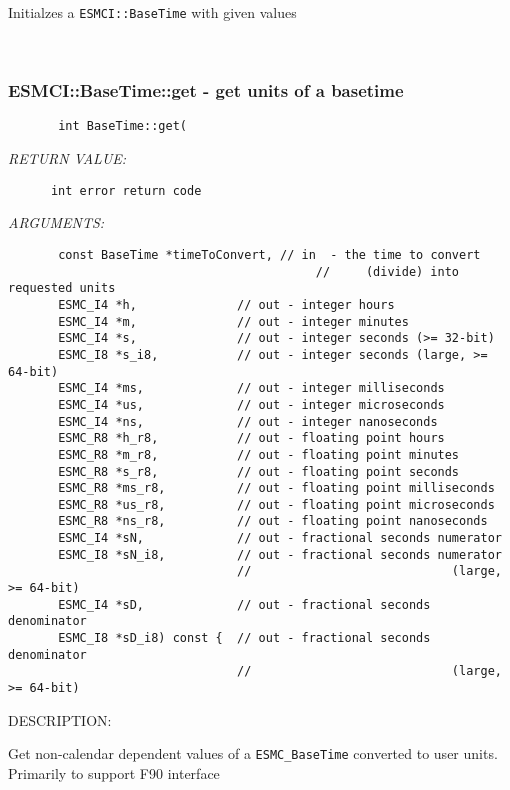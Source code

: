         Initialzes a {\tt ESMCI::BaseTime} with given values
   
 
\mbox{}\hrulefill\ 
 
\subsubsection [ESMCI::BaseTime::get] {ESMCI::BaseTime::get - get units of a basetime}


  
\begin{verbatim}       int BaseTime::get(\end{verbatim}{\em RETURN VALUE:}
\begin{verbatim}      int error return code\end{verbatim}{\em ARGUMENTS:}
\begin{verbatim}       const BaseTime *timeToConvert, // in  - the time to convert
                                           //     (divide) into requested units
       ESMC_I4 *h,              // out - integer hours
       ESMC_I4 *m,              // out - integer minutes
       ESMC_I4 *s,              // out - integer seconds (>= 32-bit)
       ESMC_I8 *s_i8,           // out - integer seconds (large, >= 64-bit)
       ESMC_I4 *ms,             // out - integer milliseconds
       ESMC_I4 *us,             // out - integer microseconds
       ESMC_I4 *ns,             // out - integer nanoseconds
       ESMC_R8 *h_r8,           // out - floating point hours
       ESMC_R8 *m_r8,           // out - floating point minutes
       ESMC_R8 *s_r8,           // out - floating point seconds
       ESMC_R8 *ms_r8,          // out - floating point milliseconds
       ESMC_R8 *us_r8,          // out - floating point microseconds
       ESMC_R8 *ns_r8,          // out - floating point nanoseconds
       ESMC_I4 *sN,             // out - fractional seconds numerator
       ESMC_I8 *sN_i8,          // out - fractional seconds numerator
                                //                            (large, >= 64-bit)
       ESMC_I4 *sD,             // out - fractional seconds denominator
       ESMC_I8 *sD_i8) const {  // out - fractional seconds denominator
                                //                            (large, >= 64-bit)
 \end{verbatim}
{\sf DESCRIPTION:\\ }


        Get non-calendar dependent values of a {\tt ESMC\_BaseTime}
        converted to user units.  Primarily to support F90 interface
   
